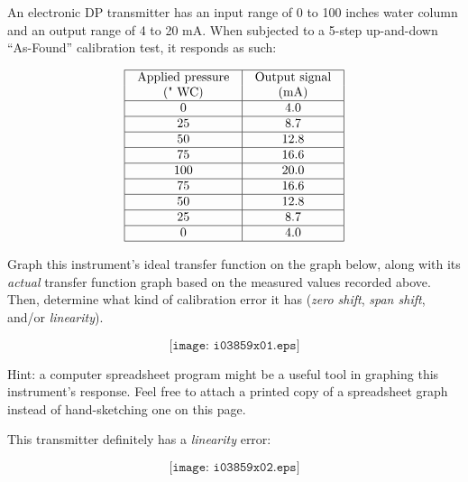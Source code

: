 

An electronic DP transmitter has an input range of 0 to 100 inches water column and an output range of 4 to 20 mA.  When subjected to a 5-step up-and-down ``As-Found'' calibration test, it responds as such: 


$$\vbox{\offinterlineskip
\halign{\strut
\vrule \quad\hfil # \ \hfil & 
\vrule \quad\hfil # \ \hfil \vrule \cr
\noalign{\hrule}
%
Applied pressure & Output signal \cr
%
(" WC) & (mA) \cr
%
\noalign{\hrule}
%
0 & 4.0 \cr
%
\noalign{\hrule}
%
25 & 8.7 \cr
%
\noalign{\hrule}
%
50 & 12.8 \cr
%
\noalign{\hrule}
%
75 & 16.6 \cr
%
\noalign{\hrule}
%
100 & 20.0 \cr
%
\noalign{\hrule}
%
75 & 16.6 \cr
%
\noalign{\hrule}
%
50 & 12.8 \cr
%
\noalign{\hrule}
%
25 & 8.7 \cr
%
\noalign{\hrule}
%
0 & 4.0 \cr
%
\noalign{\hrule}
} %
}$$ %

Graph this instrument's ideal transfer function on the graph below, along with its {\it actual} transfer function graph based on the measured values recorded above.  Then, determine what kind of calibration error it has ({\it zero shift}, {\it span shift}, and/or {\it linearity}).

$$\texttt{[image: i03859x01.eps]}$$

Hint: a computer spreadsheet program might be a useful tool in graphing this instrument's response.  Feel free to attach a printed copy of a spreadsheet graph instead of hand-sketching one on this page.














This transmitter definitely has a {\it linearity} error:

$$\texttt{[image: i03859x02.eps]}$$



